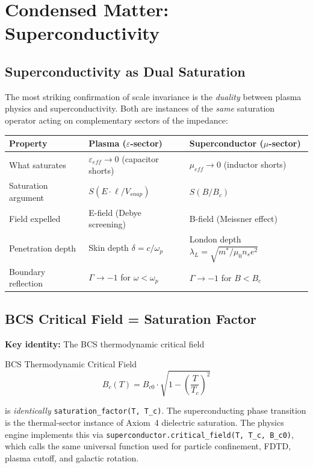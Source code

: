 
\chapter{Condensed Matter: Superconductivity}
\label{ch:condensed_matter_v7}

\section{Superconductivity as Dual Saturation}
\label{sec:superconductivity_duality}

The most striking confirmation of scale invariance is the
\textit{duality} between plasma physics and superconductivity.
Both are instances of the \textit{same} saturation operator acting
on complementary sectors of the impedance:

\begin{center}
\small
\renewcommand{\arraystretch}{1.2}
\begin{tabular}{lll}
\toprule
\textbf{Property} & \textbf{Plasma ($\varepsilon$-sector)} & \textbf{Superconductor ($\mu$-sector)} \\
\midrule
What saturates      & $\varepsilon_{eff} \to 0$ (capacitor shorts)
                    & $\mu_{eff} \to 0$ (inductor shorts) \\
Saturation argument & $S(E \cdot \ell / V_{snap})$
                    & $S(B / B_c)$ \\
Field expelled      & E-field (Debye screening)
                    & B-field (Meissner effect) \\
Penetration depth   & Skin depth $\delta = c/\omega_p$
                    & London depth $\lambda_L = \sqrt{m^*/\mu_0 n_s e^2}$ \\
Boundary reflection & $\Gamma \to -1$ for $\omega < \omega_p$
                    & $\Gamma \to -1$ for $B < B_c$ \\
\bottomrule
\end{tabular}
\end{center}

\section{BCS Critical Field = Saturation Factor}

\textbf{Key identity:} The BCS thermodynamic critical field
\begin{resultbox}{BCS Thermodynamic Critical Field}
\begin{equation}
    B_c(T) = B_{c0} \cdot \sqrt{1 - \left(\frac{T}{T_c}\right)^{\!2}}
    \label{eq:bcs_saturation}
\end{equation}
\end{resultbox}
is \textit{identically} \texttt{saturation\_factor(T, T\_c)}.  The
superconducting phase transition is the thermal-sector instance of
Axiom~4 dielectric saturation.  The physics engine implements this
via \texttt{superconductor.critical\_field(T, T\_c, B\_c0)}, which
calls the same universal function used for particle confinement,
FDTD, plasma cutoff, and galactic rotation.


